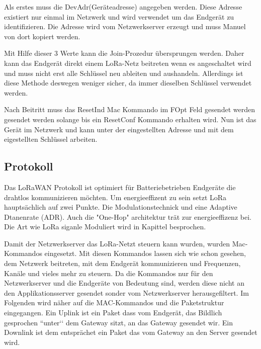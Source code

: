 \documentclass[a4paper,12pt]{article}
\begin{document}
                Als erstes muss die DevAdr(Geräteadresse) angegeben werden. Diese Adresse existiert nur einmal im 
                Netzwerk und wird verwendet um das Endgerät zu identifizieren. Die Adresse wird vom Netzwerkserver 
                erzeugt und muss Manuel von dort kopiert werden. 

                Mit Hilfe dieser 3 Werte kann die Join-Prozedur übersprungen werden. Daher kann 
                das Endgerät direkt einem LoRa-Netz beitreten wenn es angeschaltet wird und muss nicht erst alle 
                Schlüssel neu ableiten und aushandeln. Allerdings ist diese Methode deswegen weniger sicher, da immer 
                dieselben Schlüssel verwendet werden.

                Nach Beitritt muss das ResetInd Mac Kommando im FOpt Feld gesendet werden gesendet werden solange bis 
                ein ResetConf Kommando erhalten wird. Nun ist das Gerät im Netzwerk und kann unter der eingestellten 
                Adresse und mit dem eigestellten Schlüssel arbeiten.\cite[S. 64]{LoRaSpec}    
        \subsection{Protokoll} \label{sec:protokoll}
            Das LoRaWAN Protokoll ist optimiert für Batteriebetrieben Endgeräte die drahtlos kommunizieren möchten. 
            Um energieeffizent zu sein setzt LoRa hauptsächlich auf zwei Punkte. Die Modulationstechnick und eine 
            Adaptive Dtanenrate (ADR). Auch die 
            "One-Hop" architektur trät zur energieeffizenz bei. Die Art wie LoRa siganle Moduliert wird in Kapittel 
             besprochen. \cite[S,1 f]{LoraClasses}


            Damit der Netzwerkserver das LoRa-Netzt steuern kann wurden, wurden Mac-Kommandos eingesetzt. Mit diesen 
            Kommandos lassen sich wie schon gesehen, dem Netzwerk beitreten, mit dem Endgerät kommunizieren und 
            Frequenzen, Kanäle und vieles mehr zu steuern.
            Da die Kommandos nur für den Netzwerkserver und die Endgeräte von Bedeutung sind, werden diese nicht an 
            den Applikationsserver gesendet sonder vom Netzwerkserver herausgefiltert. Im Folgenden wird näher auf 
            die MAC-Kommandos und die Paketstruktur eingegangen.
            Ein Uplink ist ein Paket dass vom Endgerät, das Bildlich gesprochen ``unter‘‘ dem Gateway sitzt, an das 
            Gateway gesendet wir. Ein Downlink ist dem entsprächet ein Paket das vom Gateway an den Server gesendet 
            wird.
\end{document}
